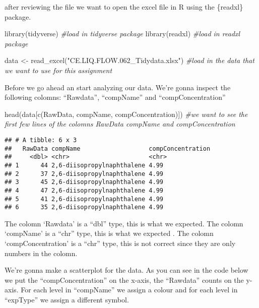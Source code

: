 \documentclass[
]{book}
\newenvironment{Shaded}{\begin{snugshade}}{\end{snugshade}}
\newcommand{\CommentTok}[1]{\textcolor[rgb]{0.56,0.35,0.01}{\textit{#1}}}
\newcommand{\FunctionTok}[1]{\textcolor[rgb]{0.00,0.00,0.00}{#1}}
\newcommand{\NormalTok}[1]{#1}
\newcommand{\OtherTok}[1]{\textcolor[rgb]{0.56,0.35,0.01}{#1}}
\newcommand{\StringTok}[1]{\textcolor[rgb]{0.31,0.60,0.02}{#1}}
\begin{document}
after reviewing the file we want to open the excel file in R using the \{readxl\} package.

\begin{Shaded}
\begin{Highlighting}[]
\FunctionTok{library}\NormalTok{(tidyverse) }\CommentTok{\#load in tidyverse package}
\FunctionTok{library}\NormalTok{(readxl) }\CommentTok{\#load in readxl package }

\NormalTok{data }\OtherTok{\textless{}{-}} \FunctionTok{read\_excel}\NormalTok{(}\StringTok{"CE.LIQ.FLOW.062\_Tidydata.xlsx"}\NormalTok{) }\CommentTok{\#load in the data that we want to use for this assignment}
\end{Highlighting}
\end{Shaded}

Before we go ahead an start analyzing our data. We're gonna inspect the following colomns: ``Rawdata'', ``compName'' and ``compConcentration''

\begin{Shaded}
\begin{Highlighting}[]
\FunctionTok{head}\NormalTok{(data[}\FunctionTok{c}\NormalTok{(}\StringTok{\textquotesingle{}RawData\textquotesingle{}}\NormalTok{, }\StringTok{\textquotesingle{}compName\textquotesingle{}}\NormalTok{, }\StringTok{\textquotesingle{}compConcentration\textquotesingle{}}\NormalTok{)]) }\CommentTok{\#we want to see the first few lines of the colomns RawData compName and compConcentration}
\end{Highlighting}
\end{Shaded}

\begin{verbatim}
## # A tibble: 6 x 3
##   RawData compName                   compConcentration
##     <dbl> <chr>                      <chr>            
## 1      44 2,6-diisopropylnaphthalene 4.99             
## 2      37 2,6-diisopropylnaphthalene 4.99             
## 3      45 2,6-diisopropylnaphthalene 4.99             
## 4      47 2,6-diisopropylnaphthalene 4.99             
## 5      41 2,6-diisopropylnaphthalene 4.99             
## 6      35 2,6-diisopropylnaphthalene 4.99
\end{verbatim}

The colomn `Rawdata' is a ``dbl'' type, this is what we expected.
The colomn `compName' is a ``chr'' type, this is what we expected .
The colomn `compConcentration' is a ``chr'' type, this is not correct since they are only numbers in the colomn.

We're gonna make a scatterplot for the data. As you can see in the code below we put the ``compConcentration'' on the x-axis, the ``Rawdata'' counts on the y-axis. For each level in ``compName'' we assign a colour and for each level in ``expType'' we assign a different symbol.
\end{document}
